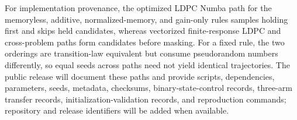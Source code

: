 \documentclass[aps,prapplied,preprint,superscriptaddress,longbibliography,floatfix]{revtex4-2}
\begin{document}
For implementation provenance, the optimized LDPC Numba path for the memoryless, additive, normalized-memory, and gain-only rules samples holding first and skips held candidates, whereas vectorized finite-response LDPC and cross-problem paths form candidates before masking.  For a fixed rule, the two orderings are transition-law equivalent but consume pseudorandom numbers differently, so equal seeds across paths need not yield identical trajectories.  The public release will document these paths and provide scripts, dependencies, parameters, seeds, metadata, checksums, binary-state-control records, three-arm transfer records, initialization-validation records, and reproduction commands; repository and release identifiers will be added when available.
\end{document}

